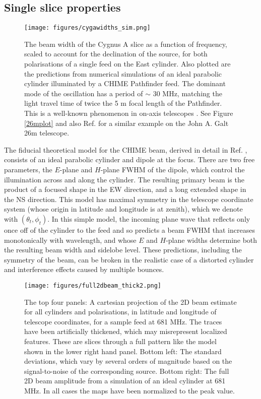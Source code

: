 \subsection{Single slice properties}

\begin{figure}[ht] %
	\centering
	\texttt{[image: figures/cygawidths\_sim.png]}%
	\caption{The beam width of the Cygnus A slice as a function of frequency, scaled to account for the declination of the source, for both polarisations of a single feed on the East cylinder. Also plotted are the predictions from numerical simulations of an ideal parabolic cylinder illuminated by a CHIME Pathfinder feed. The dominant mode of the oscillation has a period of $\sim$ 30 MHz, matching the light travel time of twice the 5 m focal length of the Pathfinder. This is a well-known phenomenon in on-axis telescopes \citep{wander1, wander2}. See Figure \ref{26mplot} and also Ref. \citep{wolleben1} for a similar example on the John A. Galt 26m telescope.}
	\label{beamwidths}
\end{figure}

The fiducial theoretical model for the CHIME beam, derived in detail in Ref. \citep{mmodes2}, consists of an ideal parabolic cylinder and dipole at the focus. There are two free parameters, the $E$-plane and $H$-plane FWHM of the dipole, which control the illumination across and along the cylinder. The resulting primary beam is the product of a focused shape in the EW direction, and a long extended shape in the NS direction. This model has maximal symmetry in the telescope coordinate system (whose origin in latitude and longitude is at zenith), which we denote with $(\theta_t, \phi_t)$. In this simple model, the incoming plane wave that reflects only once off of the cylinder to the feed and so predicts a beam FWHM that increases monotonically with wavelength, and whose $E$ and $H$-plane widths determine both the resulting beam width and sidelobe level. These predictions, including the symmetry of the beam, can be broken in the realistic case of a distorted cylinder and interference effects caused by multiple bounces. 

\begin{figure}[htp] %
	\centering
	\texttt{[image: figures/full2dbeam\_thick2.png]}%
	\caption{The top four panels: A cartesian projection of the 2D beam estimate for all cylinders and polarisations, in latitude and longitude of telescope coordinates, for a sample feed at 681 MHz. The traces have been artificially thickened, which may misrepresent localized features. These are slices through a full pattern like the model shown in the lower right hand panel. Bottom left: The standard deviations, which vary by several orders of magnitude based on the signal-to-noise of the corresponding source. Bottom right: The full 2D beam amplitude from a simulation of an ideal cylinder at 681 MHz. In all cases the maps have been normalized to the peak value.}
	\label{full2dbeam}
\end{figure}


